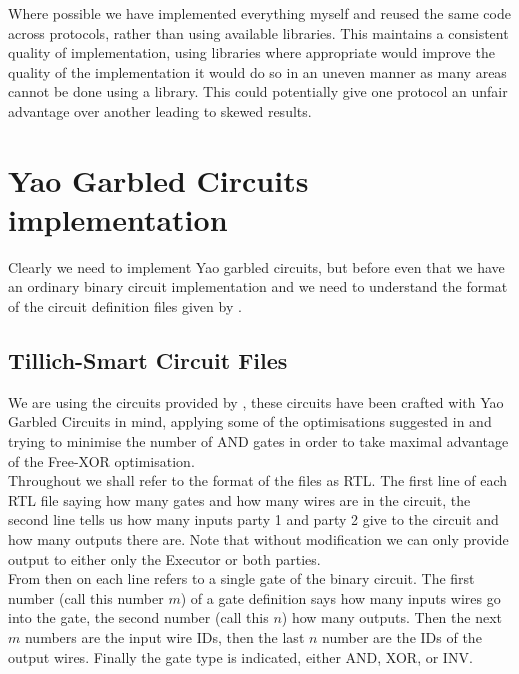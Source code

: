 \documentclass[ %
                    author={Nicholas Tutte},
                supervisor={Prof. Nigel Smart},
                    degree={MEng},
                     title={Secure Two Party Computation},
                  subtitle={A practical comparison of recent protocols},
                      type={Research - GG1K},
                      year={2015} ]{dissertation}
\begin{document}
			Where possible we have implemented everything myself and reused the same code across protocols, rather than using available libraries. This maintains a consistent quality of implementation, using libraries where appropriate would improve the quality of the implementation it would do so in an uneven manner as many areas cannot be done using a library. This could potentially give one protocol an unfair advantage over another leading to skewed results.

		\section{Yao Garbled Circuits implementation}

			Clearly we need to implement Yao garbled circuits, but before even that we have an ordinary binary circuit implementation and we need to understand the format of the circuit definition files given by \cite{NigelCircuits}.

			\subsection{Tillich-Smart Circuit Files}

				We are using the circuits provided by \cite{NigelCircuits}, these circuits have been crafted with Yao Garbled Circuits in mind, applying some of the optimisations suggested in \cite{SMC_Is_Practical} and trying to minimise the number of AND gates in order to take maximal advantage of the Free-XOR optimisation.\\

				Throughout we shall refer to the format of the files as RTL. The first line of each RTL file saying how many gates and how many wires are in the circuit, the second line tells us how many inputs party 1 and party 2 give to the circuit and how many outputs there are. Note that without modification we can only provide output to either only the Executor or both parties.\\

				From then on each line refers to a single gate of the binary circuit. The first number (call this number $m$) of a gate definition says how many inputs wires go into the gate, the second number (call this $n$) how many outputs. Then the next $m$ numbers are the input wire IDs, then the last $n$ number are the IDs of the output wires. Finally the gate type is indicated, either AND, XOR, or INV.\\
\end{document}
